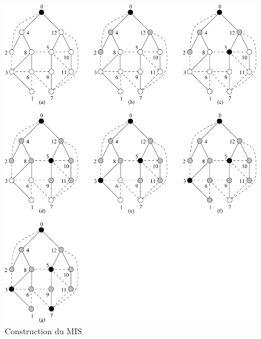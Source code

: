 \begin{figure}
\begin{center}
\includegraphics[scale=0.6]{images/figureMIS.jpg}
\caption{Construction du MIS}
\end{center}
\end{figure}

